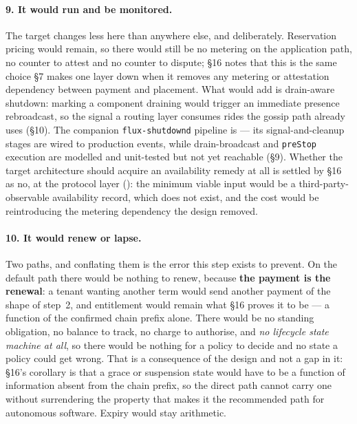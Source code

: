 \paragraph{9. It would run and be monitored.}
The target changes less here than anywhere else, and deliberately. Reservation pricing would remain,
so there would still be no metering on the application path, no counter to attest and no counter to
dispute; \S16 notes that this is the same choice \S7 makes one layer down when it removes any
metering or attestation dependency between payment and placement. What  would add is
drain-aware shutdown: marking a component draining would trigger an immediate presence rebroadcast,
so the signal a routing layer consumes rides the gossip path \FluxOS already uses (\S10). The
companion \texttt{flux-shutdownd} pipeline is \inprogress --- its signal-and-cleanup stages are wired
to production events, while drain-broadcast and \texttt{preStop} execution are modelled and
unit-tested but not yet reachable (\S9). Whether the target architecture should acquire an
availability remedy at all is settled by \S16 as no, at the protocol layer (): the
minimum viable input would be a third-party-observable availability record, which does not exist, and the
cost would be reintroducing the metering dependency the design removed.

\paragraph{10. It would renew or lapse.}
Two paths, and conflating them is the error this step exists to prevent. On the default path there
would be nothing to renew, because \textbf{the payment is the renewal}: a tenant wanting another term
would send another payment of the shape of step~2, and entitlement would remain what \S16 proves it
to be --- a function of the confirmed chain prefix alone. There would be no standing obligation, no
balance to track, no charge to authorise, and \emph{no lifecycle state machine at all}, so there
would be nothing for a policy to decide and no state a policy could get wrong. That is a consequence
of the design and not a gap in it: \S16's corollary is that a grace or suspension state would have to
be a function of information absent from the chain prefix, so the direct path cannot carry one
without surrendering the property that makes it the recommended path for autonomous software. Expiry
would stay arithmetic.


